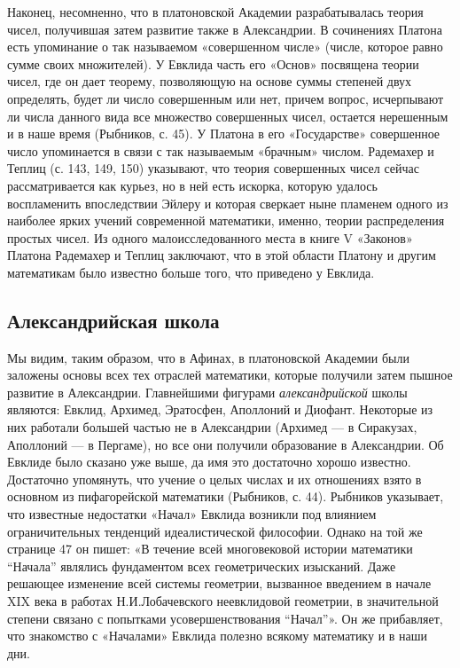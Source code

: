 Наконец,  несомненно,  что  в  платоновской  Академии  разрабатывалась
теория  чисел,  получившая  затем  развитие  также  в  Александрии.  В
сочинениях  Платона  есть  упоминание о  так  называемом  «совершенном
числе»  (числе,  которое  равно  сумме своих  множителей).  У  Евклида
часть  его  «Основ»  посвящена  теории чисел,  где  он  дает  теорему,
позволяющую  на  основе  суммы  степеней  двух  определять,  будет  ли
число  совершенным  или  нет,  причем  вопрос,  исчерпывают  ли  числа
данного вида  все множество  совершенных чисел, остается  нерешенным и
в  наше  время  (Рыбников,  с.  45). У  Платона  в  его  «Государстве»
совершенное  число  упоминается в  связи  с  так называемым  «брачным»
числом. Радемахер  и Теплиц (с.  143, 149, 150) указывают,  что теория
совершенных чисел  сейчас рассматривается  как курьез,  но в  ней есть
искорка, которую  удалось воспламенить  впоследствии Эйлеру  и которая
сверкает  ныне пламенем  одного из  наиболее ярких  учений современной
математики,  именно, теории  распределения  простых  чисел. Из  одного
малоисследованного  места  в книге  V  «Законов»  Платона Радемахер  и
Теплиц заключают, что в этой области Платону и другим математикам было
известно больше того, что приведено у Евклида.

\subsection{Александрийская школа}

Мы  видим,  таким  образом,  что в  Афинах,  в  платоновской  Академии
были   заложены  основы   всех   тех   отраслей  математики,   которые
получили  затем пышное  развитие в  Александрии. Главнейшими  фигурами
\emph{александрийской}  школы  являются: Евклид,  Архимед,  Эратосфен,
Аполлоний и  Диофант. Некоторые  из них работали  большей частью  не в
Александрии  (Архимед  ---  в  Сиракузах, Аполлоний  ---  в  Пергаме),
но  все  они  получили  образование в  Александрии.  Об  Евклиде  было
сказано уже  выше, да имя  это достаточно хорошо  известно. Достаточно
упомянуть, что учение о целых числах  и их отношениях взято в основном
из  пифагорейской математики  (Рыбников, с.  44). Рыбников  указывает,
что  известные  недостатки  «Начал»   Евклида  возникли  под  влиянием
ограничительных тенденций идеалистической философии.  Однако на той же
странице 47 он пишет: «В  течение всей многовековой истории математики
``Начала''  являлись фундаментом  всех геометрических  изысканий. Даже
решающее  изменение  всей  системы геометрии,  вызванное  введением  в
начале  XIX века  в работах  Н.И.Лобачевского неевклидовой  геометрии,
в   значительной  степени   связано  с   попытками  усовершенствования
``Начал''».  Он же  прибавляет,  что знакомство  с «Началами»  Евклида
полезно всякому математику и в наши дни.

